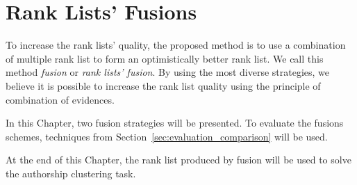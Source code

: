 \chapter{Rank Lists' Fusions \label{sec:fusions}}

To increase the rank lists' quality, the proposed method is to use a combination of multiple rank list to form an optimistically better rank list.
We call this method \textit{fusion} or \textit{rank lists' fusion}.
By using the most diverse strategies, we believe it is possible to increase the rank list quality using the principle of combination of evidences.

In this Chapter, two fusion strategies will be presented.
To evaluate the fusions schemes, techniques from Section~\ref{sec:evaluation_comparison} will be used.

At the end of this Chapter, the rank list produced by fusion will be used to solve the authorship clustering task.





